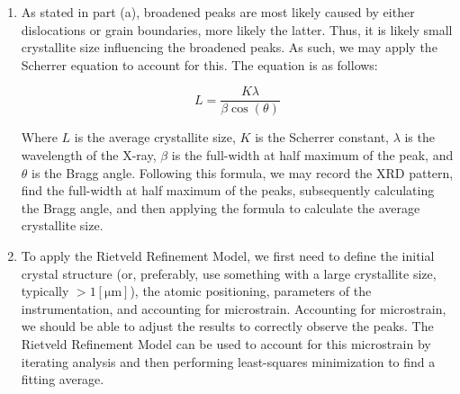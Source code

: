 \begin{enumerate}
\begin{enumerate}
      \item As stated in part (a), broadened peaks are most likely caused by either dislocations or grain boundaries, more likely the latter. Thus, it is likely small crystallite size influencing the broadened peaks. As such, we may apply the Scherrer equation to account for this. The equation is as follows:

        $$L=\frac{K\lambda}{\beta\cos(\theta)}$$

        Where $L$ is the average crystallite size, $K$ is the Scherrer constant, $\lambda$ is the wavelength of the X-ray, $\beta$ is the full-width at half maximum of the peak, and $\theta$ is the Bragg angle. Following this formula, we may record the XRD pattern, find the full-width at half maximum of the peaks, subsequently calculating the Bragg angle, and then applying the formula to calculate the average crystallite size.

      \item To apply the Rietveld Refinement Model, we first need to define the initial crystal structure (or, preferably, use something with a large crystallite size, typically $>1[\si{\micro\meter}]$), the atomic positioning, parameters of the instrumentation, and accounting for microstrain. Accounting for microstrain, we should be able to adjust the results to correctly observe the peaks. The Rietveld Refinement Model can be used to account for this microstrain by iterating analysis and then performing least-squares minimization to find a fitting average.

    \end{enumerate}

\end{enumerate}



